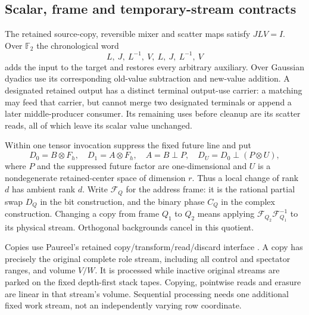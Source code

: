 \subsection{Scalar, frame and temporary-stream contracts}
The retained source-copy, reversible mixer and scatter maps satisfy
$JLV=I$. Over $\mathbb F_2$ the chronological word
\[
 L,\ J,\ L^{-1},\ V,\ L,\ J,\ L^{-1},\ V
\]
adds the input to the target and restores every arbitrary auxiliary.
Over Gaussian dyadics use its corresponding old-value subtraction and
new-value addition. A designated retained output has a distinct terminal
output-use carrier: a matching may feed that carrier, but cannot merge
two designated terminals or append a later middle-producer consumer.
Its remaining uses before cleanup are its scatter reads, all of which
leave its scalar value unchanged.

Within one tensor invocation suppress the fixed future line and put
\[
 D_0=B\otimes F_h,\quad D_1=A\otimes F_h,\quad
 A=B\mathbin{\perp}P,\quad D_U=D_0\mathbin{\perp}(P\otimes U),
\]
where $P$ and the suppressed future factor are one-dimensional and
$U$ is a nondegenerate retained-center space of dimension $r$.
Thus a local change of rank $d$ has ambient rank $d$.
Write $\mathcal F_Q$ for the address frame: it is the rational partial
swap $D_Q$ in the bit construction, and the binary phase $C_Q$ in the
complex construction. Changing a copy from frame $Q_1$ to $Q_2$ means
applying $\mathcal F_{Q_2}\mathcal F_{Q_1}^{-1}$ to its physical stream.
Orthogonal backgrounds cancel in this quotient.

Copies use Paureel's retained copy/transform/read/discard interface
\cite{paureel,pr29}. A copy has precisely the original complete role
stream, including all control and spectator ranges, and volume $V/W$.
It is processed while inactive original streams are parked on the fixed
depth-first stack tapes. Copying, pointwise reads and erasure are linear
in that stream's volume. Sequential processing needs one additional
fixed work stream, not an independently varying row coordinate.

